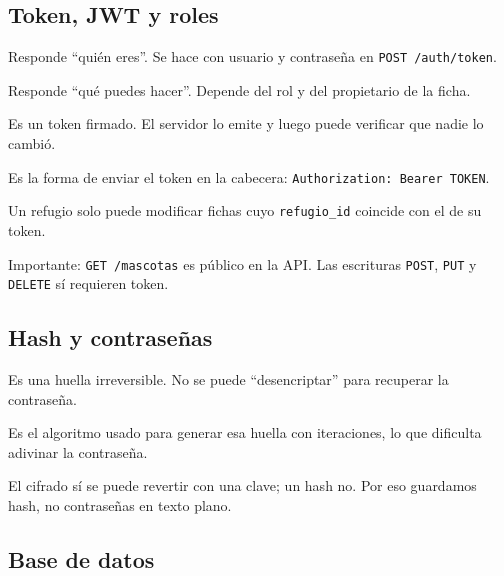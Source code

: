 \documentclass[11pt,a4paper]{article}
\newcommand{\code}[1]{\texttt{#1}}
\begin{document}
\subsection{Token, JWT y roles}

\begin{description}[leftmargin=*,style=nextline]
  \item[Autenticación.] Responde ``quién eres''. Se hace con usuario y
    contraseña en \code{POST /auth/token}.
  \item[Autorización.] Responde ``qué puedes hacer''. Depende del rol y del
    propietario de la ficha.
  \item[JWT.] Es un token firmado. El servidor lo emite y luego puede verificar
    que nadie lo cambió.
  \item[Bearer.] Es la forma de enviar el token en la cabecera:
    \code{Authorization: Bearer TOKEN}.
  \item[Propietario.] Un refugio solo puede modificar fichas cuyo
    \code{refugio\_id} coincide con el de su token.
\end{description}

Importante: \code{GET /mascotas} es público en la API. Las escrituras
\code{POST}, \code{PUT} y \code{DELETE} sí requieren token.

\subsection{Hash y contraseñas}

\begin{description}[leftmargin=*,style=nextline]
  \item[Hash.] Es una huella irreversible. No se puede ``desencriptar'' para
    recuperar la contraseña.
  \item[PBKDF2.] Es el algoritmo usado para generar esa huella con iteraciones,
    lo que dificulta adivinar la contraseña.
  \item[Diferencia con cifrado.] El cifrado sí se puede revertir con una clave;
    un hash no. Por eso guardamos hash, no contraseñas en texto plano.
\end{description}

\subsection{Base de datos}
\end{document}
